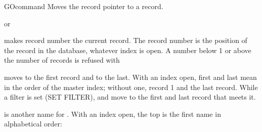 \begin{XbaseEntry}{GO}{command}
%
Moves the record pointer to a record.
\Syntax
{}
\par or\par
{}
\Usage
{}  makes record number  the current record.  The
record number is the position of the record in the database, whatever index
is open.  A number below 1 or above the number of records is refused with

 moves to the first record and  to the last.  With
an index open, first and last mean in the order of the master index; without
one, record 1 and the last record.  While a filter is set (SET FILTER),
 and  move to the first and last record that meets
it.

 is another name for .
\Examples
{}
With an index open, the top is the first name in alphabetical order:
\end{XbaseEntry}


